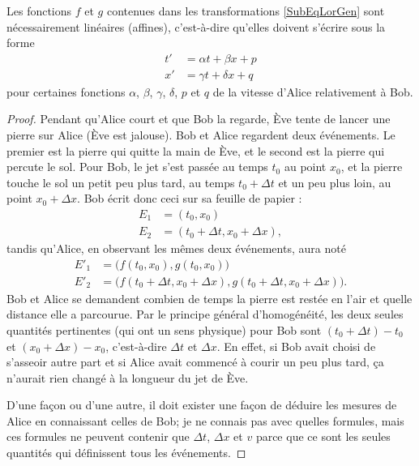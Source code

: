 \begin{proposition}
	Les fonctions \( f\) et \( g\) contenues dans les transformations \eqref{SubEqLorGen} sont nécessairement linéaires (affines), c'est-à-dire qu'elles doivent s'écrire sous la forme
	\[
		\begin{split}
			t'&=\alpha t+\beta x+p	\\
			x'&=\gamma t+\delta x+q
		\end{split}
	\]
	pour certaines fonctions \( \alpha\), \( \beta\), \( \gamma\), \( \delta\), \( p\) et \( q\) de la vitesse d'Alice relativement à Bob.
\end{proposition}

\begin{proof}
	Pendant qu'Alice court et que Bob la regarde, Ève tente de lancer une pierre sur Alice (Ève est jalouse). Bob et Alice regardent deux événements. Le premier est la pierre qui quitte la main de Ève, et le second est la pierre qui percute le sol. Pour Bob, le jet s'est passée au temps \( t_0\) au point \( x_0\), et la pierre touche le sol un petit peu plus tard, au temps \( t_0+\Delta t\) et un peu plus loin, au point \( x_0+\Delta x\). Bob écrit donc ceci sur sa feuille de papier :
	\[
		\begin{split}
			E_1&=(t_0,x_0)\\
			E_2&=(t_0+\Delta t,x_0+\Delta x),
		\end{split}
	\]
	tandis qu'Alice, en observant les mêmes deux événements, aura noté
	\[
		\begin{split}
			E'_1&=\big( f(t_0,x_0),g(t_0,x_0) \big) \\
			E'_2&=\big( f(t_0+\Delta t,x_0+\Delta x), g(t_0+\Delta t,x_0+\Delta x) \big).
		\end{split}
	\]
	Bob et Alice se demandent combien de temps la pierre est restée en l'air et quelle distance elle a parcourue. Par le principe général d'homogénéité, les deux seules quantités pertinentes (qui ont un sens physique) pour Bob sont \( (t_0+\Delta t)-t_0\) et \( (x_0+\Delta x)-x_0\), c'est-à-dire \( \Delta t\) et \( \Delta x\). En effet, si Bob avait choisi de s'asseoir autre part et si Alice avait commencé à courir un peu plus tard, ça n'aurait rien changé à la longueur du jet de Ève.

	D'une façon ou d'une autre, il doit exister une façon de déduire les mesures de Alice en connaissant celles de Bob; je ne connais pas avec quelles formules, mais ces formules ne peuvent contenir que \( \Delta t\), \( \Delta x\) et \( v\) parce que ce sont les seules quantités qui définissent tous les événements.


\end{proof}
